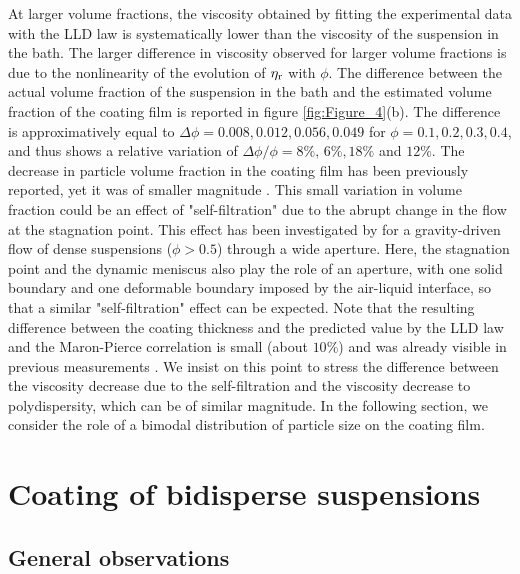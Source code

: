 \documentclass{jfm}
\begin{document}
At larger volume fractions, the viscosity obtained by fitting the experimental data with the LLD law is systematically lower than the viscosity of the suspension in the bath. The larger difference in viscosity observed for larger volume fractions is due to the nonlinearity of the evolution of $\eta_{\rm r}$ with $\phi$. The difference between the actual volume fraction of the suspension in the bath and the estimated volume fraction of the coating film is reported in figure \ref{fig:Figure_4}(b). The difference is approximatively equal to $\Delta\phi = 0.008, 0.012, 0.056, 0.049$ for  $\phi=0.1, 0.2, 0.3, 0.4$, and thus shows a relative variation of  $\Delta\phi/\phi=8\%,\, 6\%, 18\%$ and $12\%$. The decrease in particle volume fraction in the coating film has been previously reported, yet it was of smaller magnitude \cite[][]{palma2019dip}. This small variation in volume fraction could be an effect of "self-filtration" due to the abrupt change in the flow at the stagnation point. This effect has been investigated by \cite{kulkarni2010particle} for a gravity-driven flow of dense suspensions  ($\phi>0.5$) through a wide aperture. Here, the stagnation point and the dynamic meniscus also play the role of an aperture, with one solid boundary and one deformable boundary imposed by the air-liquid interface, so that a similar "self-filtration" effect can be expected. Note that the resulting difference between the coating thickness and the predicted value by the LLD law and the Maron-Pierce correlation is small (about $10\%$) and was already visible in previous measurements \cite[][]{gans2019dip}. We insist on this point to stress the difference between the viscosity decrease due to the self-filtration and the viscosity decrease to polydispersity, which can be of similar magnitude.
In the following section, we consider the role of a bimodal distribution of particle size on the coating film.



\section{Coating of bidisperse suspensions} \label{sec:bi}

\subsection{General observations}
\end{document}

